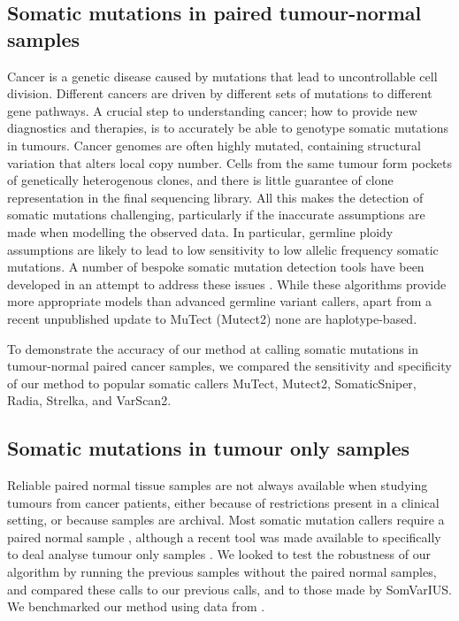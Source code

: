 \documentclass[notitlepage, twocolumn]{article}
\begin{document}
\subsection*{Somatic mutations in paired tumour-normal samples}

Cancer is a genetic disease caused by mutations that lead to uncontrollable cell division. Different cancers are driven by different sets of mutations to different gene pathways. A crucial step to understanding cancer; how to provide new diagnostics and therapies, is to accurately be able to genotype somatic mutations in tumours. Cancer genomes are often highly mutated, containing structural variation that alters local copy number. Cells from the same tumour form pockets of genetically heterogenous clones, and there is little guarantee of clone representation in the final sequencing library. All this makes the detection of somatic mutations challenging, particularly if the inaccurate assumptions are made when modelling the observed data. In particular, germline ploidy assumptions are likely to lead to low sensitivity to low allelic frequency somatic mutations. A number of bespoke somatic mutation detection tools have been developed in an attempt to address these issues \cite{RN142, RN146, RN150, RN143, RN145}. While these algorithms provide more appropriate models than advanced germline variant callers, apart from a recent unpublished update to MuTect (Mutect2) none are haplotype-based.

To demonstrate the accuracy of our method at calling somatic mutations in tumour-normal paired cancer samples, we compared the sensitivity and specificity of our method to popular somatic callers MuTect, Mutect2, SomaticSniper, Radia, Strelka, and VarScan2.

\subsection*{Somatic mutations in tumour only samples}

Reliable paired normal tissue samples are not always available when studying tumours from cancer patients, either because of restrictions present in a clinical setting, or because samples are archival. Most somatic mutation callers require a paired normal sample \cite{RN142, RN146, RN150, RN143, RN145}, although a recent tool was made available to specifically to deal analyse tumour only samples \cite{RN161}. We looked to test the robustness of our algorithm by running the previous samples without the paired normal samples, and compared these calls to our previous calls, and to those made by SomVarIUS. We benchmarked our method using data from \cite{RN147, RN155}.
\end{document}
